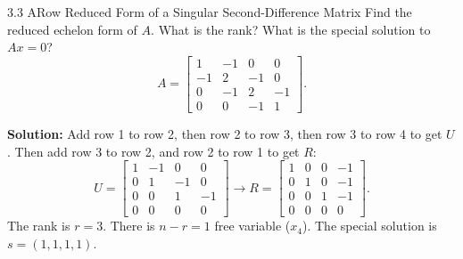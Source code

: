 \documentclass[11pt,a4paper,openany,oneside]{book}
\def\vect#1{#1}%
\def\mathbf#1{#1}%
\newcommand{\vect}[1]{\mathbf{#1}}
\numberwithin{equation}{chapter}
\begin{document}
\begin{example}{3.3 A}{Row Reduced Form of a Singular Second-Difference Matrix}
Find the reduced echelon form of $A$. What is the rank? What is the special solution to $A\vect{x} = \vect{0}$?
\[
A = \begin{bmatrix} 1 & -1 & 0 & 0 \\ -1 & 2 & -1 & 0 \\ 0 & -1 & 2 & -1 \\ 0 & 0 & -1 & 1 \end{bmatrix}.
\]
\end{example}
\textbf{Solution:} Add row 1 to row 2, then row 2 to row 3, then row 3 to row 4 to get $U$. Then add row 3 to row 2, and row 2 to row 1 to get $R$:
\[
U = \begin{bmatrix} 1 & -1 & 0 & 0 \\ 0 & 1 & -1 & 0 \\ 0 & 0 & 1 & -1 \\ 0 & 0 & 0 & 0 \end{bmatrix} \longrightarrow R = \begin{bmatrix} 1 & 0 & 0 & -1 \\ 0 & 1 & 0 & -1 \\ 0 & 0 & 1 & -1 \\ 0 & 0 & 0 & 0 \end{bmatrix}.
\]
The rank is $r = 3$. There is $n-r = 1$ free variable ($x_4$). The special solution is $\vect{s} = (1,1,1,1)$.
\end{document}
